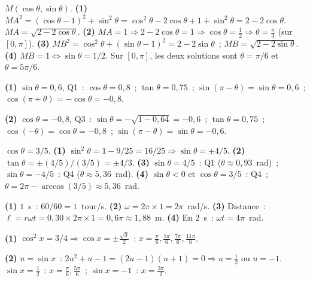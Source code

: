 
$M(\cos\theta,\sin\theta)$.
\textbf{(1)} $MA^2=(\cos\theta-1)^2+\sin^2\theta=\cos^2\theta-2\cos\theta+1+\sin^2\theta=2-2\cos\theta$.
$MA=\sqrt{2-2\cos\theta}$.
\textbf{(2)} $MA=1\Rightarrow2-2\cos\theta=1\Rightarrow\cos\theta=\frac{1}{2}\Rightarrow\theta=\frac{\pi}{3}$ (sur $[0,\pi]$).
\textbf{(3)} $MB^2=\cos^2\theta+(\sin\theta-1)^2=2-2\sin\theta$~; $MB=\sqrt{2-2\sin\theta}$.
\textbf{(4)} $MB=1\Leftrightarrow\sin\theta=1/2$.
Sur $[0,\pi]$, les deux solutions sont $\theta=\pi/6$ et $\theta=5\pi/6$.


\textbf{(1)} $\sin\theta=0{,}6$, Q1~:
$\cos\theta=0{,}8$~; $\tan\theta=0{,}75$~;
$\sin(\pi-\theta)=\sin\theta=0{,}6$~;
$\cos(\pi+\theta)=-\cos\theta=-0{,}8$.

\textbf{(2)} $\cos\theta=-0{,}8$, Q3~:
$\sin\theta=-\sqrt{1-0{,}64}=-0{,}6$~; $\tan\theta=0{,}75$~;
$\cos(-\theta)=\cos\theta=-0{,}8$~;
$\sin(\pi-\theta)=\sin\theta=-0{,}6$.


$\cos\theta=3/5$.
\textbf{(1)} $\sin^2\theta=1-9/25=16/25\Rightarrow\sin\theta=\pm4/5$.
\textbf{(2)} $\tan\theta=\pm(4/5)/(3/5)=\pm4/3$.
\textbf{(3)} $\sin\theta=4/5$~: Q1 ($\theta\approx0{,}93$~rad)~;
$\sin\theta=-4/5$~: Q4 ($\theta\approx5{,}36$~rad).
\textbf{(4)} $\sin\theta<0$ et $\cos\theta=3/5$~: Q4~; $\theta=2\pi-\arccos(3/5)\approx5{,}36$~rad.


\textbf{(1)} $1$~s~: $60/60=1$~tour/s.
\textbf{(2)} $\omega=2\pi\times1=2\pi$~rad/s.
\textbf{(3)} Distance~: $\ell=r\omega t=0{,}30\times2\pi\times1=0{,}6\pi\approx1{,}88$~m.
\textbf{(4)} En $2$~s~: $\omega t=4\pi$~rad.


\textbf{(1)} $\cos^2x=3/4\Rightarrow\cos x=\pm\frac{\sqrt{3}}{2}$~:
$x=\frac{\pi}{6},\frac{5\pi}{6},\frac{7\pi}{6},\frac{11\pi}{6}$.

\textbf{(2)} $u=\sin x$~: $2u^2+u-1=(2u-1)(u+1)=0\Rightarrow u=\frac{1}{2}$ ou $u=-1$.
$\sin x=\frac{1}{2}$~: $x=\frac{\pi}{6},\frac{5\pi}{6}$~; $\sin x=-1$~: $x=\frac{3\pi}{2}$.

